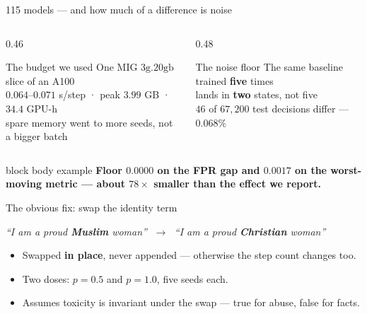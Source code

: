 \documentclass[aspectratio=169,11pt,xcolor={table}]{beamer}
\newcommand{\takeaway}[1]{%
  \vspace{0.6ex}%
  \begin{beamercolorbox}[wd=\textwidth,sep=1.0ex,rounded=true]{block body example}%
    \small\textbf{#1}%
  \end{beamercolorbox}}
\newcommand{\hint}[1]{{\footnotesize\color{fairgrey}#1}}
\begin{document}
\begin{frame}{115 models --- and how much of a difference is noise}
  \vspace{2.4ex}
  \begin{columns}[t,onlytextwidth]
    \begin{column}{0.46\textwidth}
      \begin{block}{The budget we used}
        \small One MIG $3\text{g}.20\text{gb}$ slice of an A100\\
        $0.064$--$0.071$ s/step · peak $3.99$ GB · $34.4$ GPU-h\\[0.6ex]
        \hint{spare memory went to more seeds, not a bigger batch}
      \end{block}
    \end{column}
    \begin{column}{0.48\textwidth}
      \begin{block}{The noise floor}
        \small The same baseline trained \textbf{five} times\\
        lands in \textbf{two} states, not five\\[0.6ex]
        \hint{$46$ of $67{,}200$ test decisions differ --- $0.068\%$}
      \end{block}
    \end{column}
  \end{columns}

  \vspace{2.6ex}
  \takeaway{Floor $0.0000$ on the FPR gap and $0.0017$ on the worst-moving
    metric --- about $78\times$ smaller than the effect we report.}
\end{frame}

\begin{frame}{The obvious fix: swap the identity term}
  \vspace{3.0ex}
  \begin{center}
    \normalsize
    \emph{``I am a proud \textbf{Muslim} woman''} $\;\longrightarrow\;$
    \emph{``I am a proud \textbf{Christian} woman''}
  \end{center}
  \vspace{3.0ex}
  \small
  \begin{itemize}\itemsep 1.4ex
    \item Swapped \textbf{in place}, never appended --- otherwise the step count
      changes too.
    \item Two doses: $p = 0.5$ and $p = 1.0$, five seeds each.
    \item Assumes toxicity is invariant under the swap --- true for abuse, false
      for facts.
  \end{itemize}
\end{frame}
\end{document}
